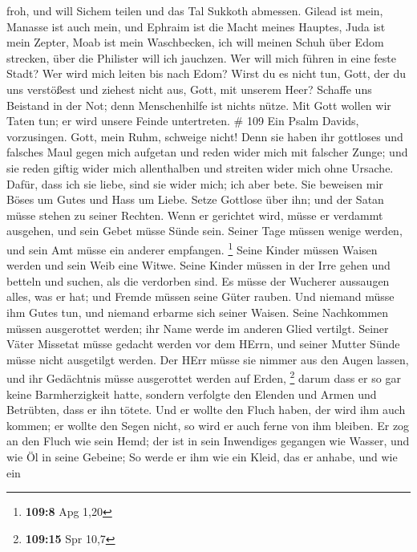 froh, und will Sichem teilen und das Tal Sukkoth abmessen. 
Gilead ist mein, Manasse ist auch mein, und Ephraim ist die Macht meines
Hauptes, Juda ist mein Zepter,  Moab ist mein Waschbecken,
ich will meinen Schuh über Edom strecken, über die Philister will ich
jauchzen.  Wer will mich führen in eine feste Stadt? Wer
wird mich leiten bis nach Edom?  Wirst du es nicht tun,
Gott, der du uns verstößest und ziehest nicht aus, Gott, mit unserem
Heer?  Schaffe uns Beistand in der Not; denn Menschenhilfe
ist nichts nütze.  Mit Gott wollen wir Taten tun; er wird
unsere Feinde untertreten. \# 109  Ein Psalm Davids,
vorzusingen. Gott, mein Ruhm, schweige nicht!  Denn sie
haben ihr gottloses und falsches Maul gegen mich aufgetan und reden
wider mich mit falscher Zunge;  und sie reden giftig wider
mich allenthalben und streiten wider mich ohne Ursache. 
Dafür, dass ich sie liebe, sind sie wider mich; ich aber bete.
 Sie beweisen mir Böses um Gutes und Hass um Liebe.
 Setze Gottlose über ihn; und der Satan müsse stehen zu
seiner Rechten.  Wenn er gerichtet wird, müsse er verdammt
ausgehen, und sein Gebet müsse Sünde sein.  Seiner Tage
müssen wenige werden, und sein Amt müsse ein anderer empfangen.
\footnote{\textbf{109:8} Apg 1,20}  Seine Kinder müssen
Waisen werden und sein Weib eine Witwe.  Seine Kinder
müssen in der Irre gehen und betteln und suchen, als die verdorben sind.
 Es müsse der Wucherer aussaugen alles, was er hat; und
Fremde müssen seine Güter rauben.  Und niemand müsse ihm
Gutes tun, und niemand erbarme sich seiner Waisen.  Seine
Nachkommen müssen ausgerottet werden; ihr Name werde im anderen Glied
vertilgt.  Seiner Väter Missetat müsse gedacht werden vor
dem HErrn, und seiner Mutter Sünde müsse nicht ausgetilgt werden.
 Der HErr müsse sie nimmer aus den Augen lassen, und ihr
Gedächtnis müsse ausgerottet werden auf Erden, \footnote{\textbf{109:15}
  Spr 10,7}  darum dass er so gar keine Barmherzigkeit
hatte, sondern verfolgte den Elenden und Armen und Betrübten, dass er
ihn tötete.  Und er wollte den Fluch haben, der wird ihm
auch kommen; er wollte den Segen nicht, so wird er auch ferne von ihm
bleiben.  Er zog an den Fluch wie sein Hemd; der ist in
sein Inwendiges gegangen wie Wasser, und wie Öl in seine Gebeine;
 So werde er ihm wie ein Kleid, das er anhabe, und wie ein
